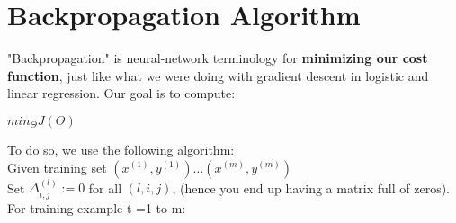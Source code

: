 \section{Backpropagation Algorithm}

"Backpropagation" is neural-network terminology for \textbf{minimizing our cost function}, just like what we were doing with gradient descent in logistic and linear regression. Our goal is to compute:

\begin{center}
	$ min_\Theta J(\Theta) $
\end{center}

To do so, we use the following algorithm:\\

Given training set $ {(x^{(1)},y^{(1)}) \dots (x^{(m)},y^{(m)})} $\\

Set $ \Delta^{(l)}_{i,j} := 0 $ for all $ (l,i,j) $, (hence you end up having a matrix full of zeros).\\

For training example t =1 to m:\\

